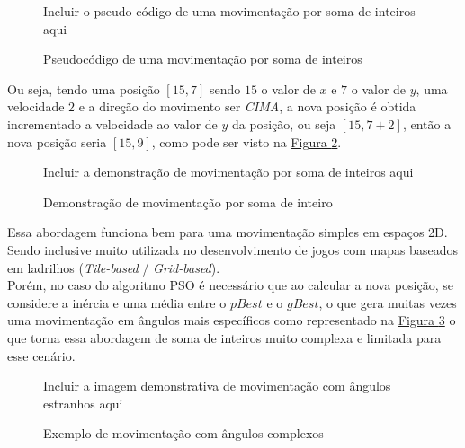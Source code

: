 \begin{figure}[ht]
\centering
\small{Incluir o pseudo código de uma movimentação por soma de inteiros aqui}
\caption{Pseudocódigo de uma movimentação por soma de inteiros}
\label{alg:mov-int-sum}
\end{figure}

Ou seja, tendo uma posição $[15, 7]$ sendo $15$ o valor de $x$ e $7$ o valor de $y$,
uma velocidade $2$ e a direção do movimento ser \textit{CIMA}, a nova posição é obtida incrementado a velocidade ao valor de $y$ da posição, ou seja $[15, 7+2]$, então a nova posição seria $[15, 9]$, como pode ser visto na 
\hyperref[fig:movimentacao-int-sum]{Figura \ref{fig:movimentacao-int-sum}}.\hfill

\begin{figure}[ht]
\centering
\small{Incluir a demonstração de movimentação por soma de inteiros aqui}
\caption{Demonstração de movimentação por soma de inteiro}
\label{fig:movimentacao-int-sum}
\end{figure}

Essa abordagem funciona bem para uma movimentação simples em espaços 2D. Sendo inclusive muito utilizada no desenvolvimento de jogos com mapas baseados em ladrilhos (\textit{Tile-based} / \textit{Grid-based}).\\
\indent Porém, no caso do algoritmo PSO é necessário que ao calcular a nova posição, se considere a inércia e uma média entre o $pBest$ e o $gBest$, o que gera muitas vezes uma movimentação em ângulos mais específicos como representado na 
\hyperref[fig:angular-moviment-grid-based]{Figura \ref{fig:angular-moviment-grid-based}}
o que torna essa abordagem de soma de inteiros muito complexa e limitada para esse cenário.\hfill

\begin{figure}[ht]
\centering
\small{Incluir a imagem demonstrativa de movimentação com ângulos estranhos aqui}
\caption{Exemplo de movimentação com ângulos complexos}
\label{fig:angular-moviment-grid-based}
\end{figure}


